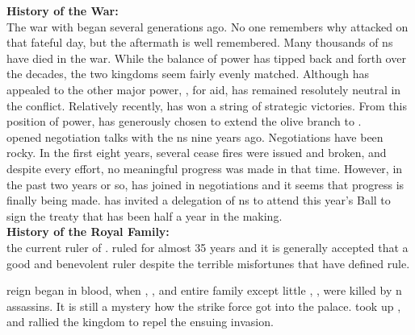 \documentclass[blue]{NeptuneBall}
\begin{document}
\name{\bAtlantican{}}



{\bf History of the War:}\\
The war with \pPacifica{} began several generations ago. No one remembers why \pPacifica{} attacked on that fateful day, but the aftermath is well remembered. Many thousands of \pAtlantis{}ns have died in the war. While the balance of power has tipped back and forth over the decades, the two kingdoms seem fairly evenly matched. Although \pAtlantis{} has appealed to the other major power, \pIndia{}, for aid, \pIndia{} has remained resolutely neutral in the conflict. Relatively recently, \pAtlantis{} has won a string of strategic victories. From this position of power, \cKing{\King} \cKing{} has generously chosen to extend the olive branch to \pPacifica{}.\\

\cKing{\King} \cKing{} opened negotiation talks with the \pPacifica{}ns nine years ago. Negotiations have been rocky. In the first eight years, several cease fires were issued and broken, and despite every effort, no meaningful progress was made in that time. However, in the past two years or so, \cPrincess{\Prince} \cPrincess{} has joined \cPrincess{\their} \cKing{\parent} in negotiations and it seems that progress is finally being made. \cKing{\King} \cKing{} has invited a delegation of \pPacifica{}ns to attend this year's \cExExKing{} Ball to sign the treaty that has been half a year in the making.\\


{\bf History of the Royal Family:}\\
\cKing{\King} \cKing{} \cKing{\are} the current ruler of \pAtlantis{}. \cKing{\They} \cKing{\have} ruled for almost 35 years and it is generally accepted that \cKing{\they} \cKing{\are} a good and benevolent ruler despite the terrible misfortunes that have defined \cKing{\their} rule.

\cKing{\Their} reign began in blood, when \cKing{\their} \cExKing{\parent}, \cExKing{\King} \cExKing{}, and \cKing{\their} entire family except \cKing{\their} little \cPlant{\sibling}, \cPlant{}, were killed by \pPacifica{}n assassins. It is still a mystery how the strike force got into the palace. \cKing{} took up \iTrident{\MYname{}}, and rallied the kingdom to repel the ensuing invasion.
\end{document}
